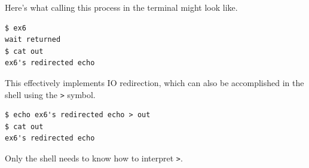 Here's what calling this process
in the terminal might look like.

\begin{verbatim}
$ ex6
wait returned
$ cat out
ex6's redirected echo
\end{verbatim}

This effectively implements IO redirection,
which can also be accomplished in the shell
using the \verb|>| symbol.

\begin{verbatim}
$ echo ex6's redirected echo > out
$ cat out
ex6's redirected echo
\end{verbatim}

Only the shell needs to know how to interpret \verb|>|.

